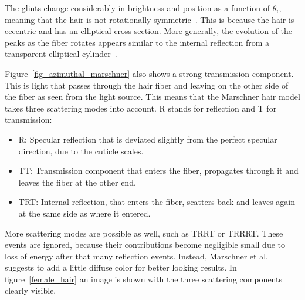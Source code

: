\documentclass[11pt,a4paper]{report}
\begin{document}
The glints change considerably in brightness and position as a function of $\theta_i$,  meaning that the hair is not rotationally symmetric~\cite{marschner}. This is because the hair is eccentric and has an elliptical cross section. More generally, the evolution of the peaks as the fiber rotates appears similar to the internal reflection from a transparent elliptical cylinder~\cite{marschner}.

Figure~\ref{fig_azimuthal_marschner} also shows a strong transmission component. This is light that passes through the hair fiber and leaving on the other side of the fiber as seen from the light source. This means that the Marschner hair model takes three scattering modes into account. R stands for reflection and T for transmission:

\begin{itemize}
\item R: Specular reflection that is deviated slightly from the perfect specular direction, due to the cuticle scales.
\item TT: Transmission component that enters the fiber, propagates through it and leaves the fiber at the other end.
\item TRT: Internal reflection, that enters the fiber, scatters back and leaves again at the same side as where it entered.
\end{itemize}

More scattering modes are possible as well, such as TRRT or TRRRT. These events are ignored, because their contributions become negligible small due to loss of energy after that many reflection events. Instead, Marschner et al.~\cite{marschner} suggests to add a little diffuse color for better looking results. In figure~\ref{female_hair} an image is shown with the three scattering components clearly visible.
\end{document}
